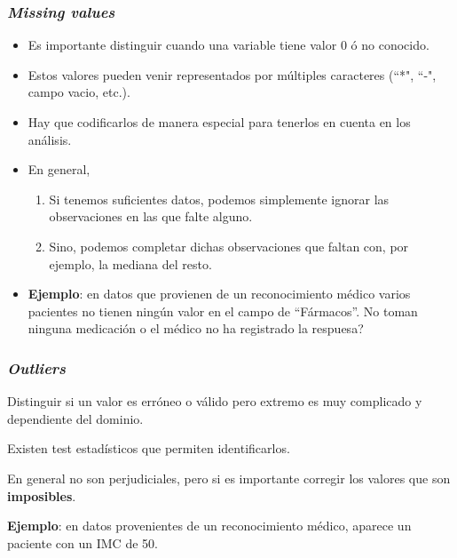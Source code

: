 \documentclass{beamer}
\newenvironment{wideitemize}{\itemize\addtolength{\itemsep}{12pt}}{\enditemize}
\begin{document}
%
%
%


\begin{frame}
\frametitle{\textit{Missing values}}

\begin{itemize}
\item Es importante distinguir cuando una variable tiene valor $0$ ó no conocido.
\item Estos valores pueden venir representados por múltiples caracteres (``*", ``-", campo vacio, etc.).
\item Hay que codificarlos de manera especial para tenerlos en cuenta en los análisis.
\item En general,
\begin{enumerate}
\item Si tenemos suficientes datos, podemos simplemente ignorar las observaciones en las que falte alguno.
\item Sino, podemos completar dichas observaciones que faltan con, por ejemplo, la mediana del resto.
\end{enumerate}
\item \textbf{Ejemplo}: en datos que provienen de un reconocimiento médico varios pacientes no tienen ningún valor en el campo de ``Fármacos''. No toman ninguna medicación o el médico no ha registrado la respuesa?
\end{itemize}
\end{frame}

\begin{frame}
\frametitle{\textit{Outliers}}
\begin{wideitemize}
\item Distinguir si un valor es erróneo o válido pero extremo es muy complicado y dependiente del dominio.
\item Existen test estadísticos que permiten identificarlos.
\item En general no son perjudiciales, pero si es importante corregir los valores que son \textbf{imposibles}.
\item \textbf{Ejemplo}: en datos provenientes de un reconocimiento médico, aparece un paciente con un IMC de 50.
\end{wideitemize}
\end{frame}
\end{document}
